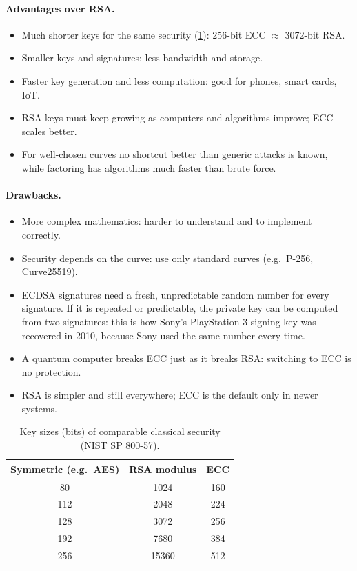 \paragraph{Advantages over RSA.}
\begin{itemize}
    \item Much shorter keys for the same security (\cref{tab:key-sizes}): 256-bit ECC $\approx$ 3072-bit RSA.
    \item Smaller keys and signatures: less bandwidth and storage.
    \item Faster key generation and less computation: good for phones, smart cards, IoT.
    \item RSA keys must keep growing as computers and algorithms improve; ECC scales better.
    \item For well-chosen curves no shortcut better than generic attacks is known, while factoring has algorithms much faster than brute force.
\end{itemize}

\paragraph{Drawbacks.}
\begin{itemize}
    \item More complex mathematics: harder to understand and to implement correctly.
    \item Security depends on the curve: use only standard curves (e.g.\ P-256, Curve25519).
    \item ECDSA signatures need a fresh, unpredictable random number for every signature. If it is repeated or predictable, the private key can be computed from two signatures: this is how Sony's PlayStation 3 signing key was recovered in 2010, because Sony used the same number every time.
    \item A quantum computer breaks ECC just as it breaks RSA: switching to ECC is no protection.
    \item RSA is simpler and still everywhere; ECC is the default only in newer systems.
\end{itemize}

\begin{table}[H]
\centering
\caption{Key sizes (bits) of comparable classical security (NIST SP 800-57).}
\label{tab:key-sizes}
\begin{tabular}{@{}ccc@{}}
\toprule
Symmetric (e.g.\ AES) & RSA modulus & ECC \\
\midrule
80  & 1024   & 160 \\
112 & 2048   & 224 \\
128 & 3072   & 256 \\
192 & 7680   & 384 \\
256 & 15360  & 512 \\
\bottomrule
\end{tabular}
\end{table}

